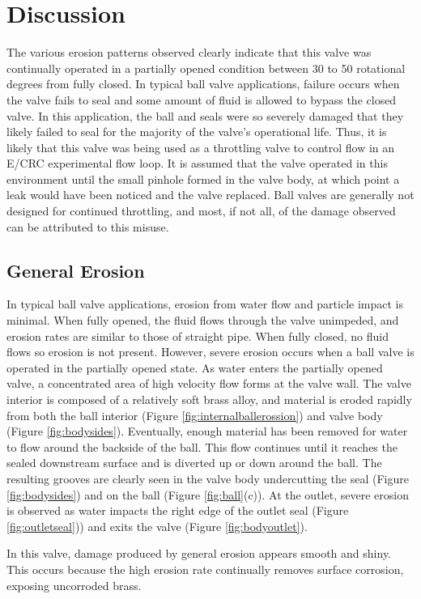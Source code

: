 \documentclass[]{article}
\begin{document}
\section{Discussion}
The various erosion patterns observed clearly indicate that this valve was continually operated in a partially opened condition between 30 to 50 rotational degrees from fully closed. In typical ball valve applications, failure occurs when the valve fails to seal and some amount of fluid is allowed to bypass the closed valve. In this application, the ball and seals were so severely damaged that they likely failed to seal for the majority of the valve's operational life. Thus, it is likely that this valve was being used as a throttling valve to control flow in an E/CRC experimental flow loop. It is assumed that the valve operated in this environment until the small pinhole formed in the valve body, at which point a leak would have been noticed and the valve replaced. Ball valves are generally not designed for continued throttling, and most, if not all, of the damage observed can be attributed to this misuse.

\subsection{General Erosion}
In typical ball valve applications, erosion from water flow and particle impact is minimal. When fully opened, the fluid flows through the valve unimpeded, and erosion rates are similar to those of straight pipe. When fully closed, no fluid flows so erosion is not present. However, severe erosion occurs when a ball valve is operated in the partially opened state. As water enters the partially opened valve, a concentrated area of high velocity flow forms at the valve wall. The valve interior is composed of a relatively soft brass alloy, and material is eroded rapidly from both the ball interior (Figure \ref{fig:internalballerossion}) and valve body (Figure \ref{fig:bodysides}). Eventually, enough material has been removed for water to flow around the backside of the ball. This flow continues until it reaches the sealed downstream surface and is diverted up or down around the ball. The resulting grooves are clearly seen in the valve body undercutting the seal (Figure \ref{fig:bodysides}) and on the ball (Figure \ref{fig:ball}(c)). At the outlet, severe erosion is observed as water impacts the right edge of the outlet seal (Figure \ref{fig:outletseal})) and exits the valve (Figure \ref{fig:bodyoutlet}). 

In this valve, damage produced by general erosion appears smooth and shiny. This occurs because the high erosion rate continually removes surface corrosion, exposing uncorroded brass. 
\end{document}
